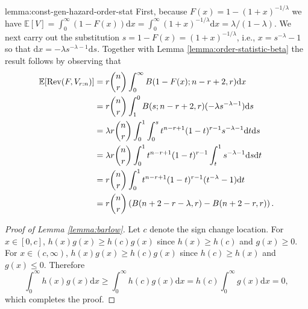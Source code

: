 \documentclass[11pt]{article}
\newcommand{\E}{\mathbb{E}}
\newcommand{\dd}{\mathrm{d}}
\newcommand{\Rev}{\mathrm{Rev}}
\begin{document}
\begin{cleverproof}{lemma:const-gen-hazard-order-stat}
    First, because $F(x) = 1- (1+x)^{-1/\lambda}$ we have $\E[V]=\int_0^\infty(1-F(x))\dd x=\int_0^\infty(1+x)^{-1/
    \lambda}\dd x=\lambda/(1-\lambda)$. 
     We next carry out the substitution $s=1-F(x) = (1+x)^{-1/\lambda}$, i.e., $x = s^{-\lambda} - 1$ so that $\mathrm{d}x = -\lambda s^{-\lambda-1}\mathrm{d}s$. Together with Lemma \ref{lemma:order-statistic-beta}  the result follows by observing that
    \begin{align*}
        \E[\Rev(F,V_{r:n})]&=r\binom{n}{r}\int_0^\infty B(1-F(x); n-r+2,r)\dd x\\
        &=r\binom{n}{r}\int_1^{0} B(s; n-r+2,r)(-\lambda s^{-\lambda -1})\dd s\\
        &=\lambda r\binom{n}{r}\int_0^{1} \int_0^{s}t^{n-r+1}(1-t)^{r-1}s^{-\lambda -1}\dd t \dd s \\
        &=\lambda r\binom{n}{r}\int_0^{1} t^{n-r+1}(1-t)^{r-1}\int_t^{1}s^{-\lambda -1}\dd s \dd t \\
        &= r\binom{n}{r}\int_0^{1} t^{n-r+1}(1-t)^{r-1}(t^{-\lambda}-1) \dd t \\
        &=r\binom{n}{r}\left(B(n+2-r-\lambda, r)-B(n+2-r, r)\right).\qedhere
    \end{align*}
\end{cleverproof}

\bigskip

\begin{proof}[Proof of Lemma \ref{lemma:barlow}]
    Let $c$ denote the sign change location. For $x\in[0,c]$, $h(x)g(x)\ge h(c)g(x)$ since $h(x)\ge h(c)$ and $g(x)\ge 0$. For $x\in(c,\infty)$, $h(x)g(x)\ge h(c)g(x)$ since $h(c)\ge h(x)$ and $g(x)\le 0$. Therefore
    $$
    \int_0^\infty h(x)g(x)\dd x\ge \int_0^\infty h(c)g(x)\dd x=h(c)\int_0^\infty g(x)\dd x=0,
    $$
    which completes the proof.
\end{proof}

\bigskip
\end{document}
